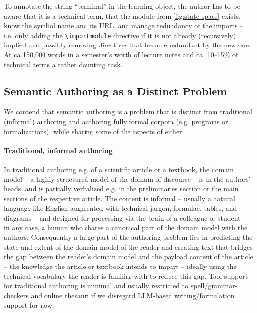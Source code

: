 \documentclass{llncs}
\newcommand\snify{\textsf{snify}\xspace}
\begin{document}
To annotate the string ``terminal'' in the learning object, the author has to be aware
that it is a technical term, that the module from \cref{fig:state-space} exists, know the
symbol name and its URL, and manage redundancy of the imports -- i.e. only
adding the \lstinline|\importmodule| directive if it is not already (recursively) implied
and possibly removing directives that become redundant by the new one.  At ca 150,000
words in a semester's worth of lecture notes and ca. 10--15\% of technical terms a rather daunting task.


\subsection{Semantic Authoring as a Distinct Problem}
We contend that semantic authoring is a problem that is distinct from traditional
(informal) authoring and authoring fully formal corpora (e.g. programs or formalizations),
while sharing some of the aspects of either.

\paragraph{Traditional, informal authoring}
In traditional authoring e.g. of a scientific article or a textbook, the domain model -- a
highly structured model of the domain of discourse -- is in the authors' heads, and is
partially verbalized e.g. in the preliminaries section or the main sections of the
respective article. The content is informal -- usually a natural language like English
augmented with technical jargon, formulae, tables, and diagrams -- and designed for
processing via the brain of a colleague or student -- in any case, a human who shares a
canonical part of the domain model with the authors. Consequently a large part of the authoring problem lies in
predicting the state and extent of the domain model of the reader and creating text that
bridges the gap between the reader's domain model and the payload content of the article
-- the knowledge the article or textbook intends to impart -- ideally using the technical
vocabulary the reader is familiar with to reduce this gap. Tool support for traditional
authoring is minimal and usually restricted to spell/grammar-checkers and online thesauri
if we disregard LLM-based writing/formulation support for now.
\end{document}
